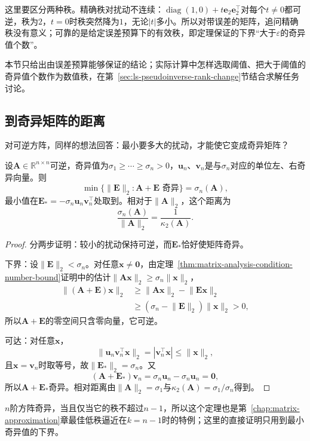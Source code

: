 这里要区分两种秩。精确秩对扰动不连续：$\operatorname{diag}(1,0)+t\bm e_2\bm e_2^\top$对每个$t\neq0$都可逆，秩为$2$，$t=0$时秩突然降为$1$，无论$|t|$多小。所以对带误差的矩阵，追问精确秩没有意义；可靠的是给定误差预算下的有效秩，即定理保证的下界“大于$\varepsilon$的奇异值个数”。

本节只给出由误差预算能够保证的结论；实际计算中怎样选取阈值、把大于阈值的奇异值个数作为数值秩，在第~\ref{sec:ls-pseudoinverse-rank-change}节结合求解任务讨论。

\subsection{到奇异矩阵的距离}
对可逆方阵，同样的想法回答：最小要多大的扰动，才能使它变成奇异矩阵？
\begin{theorem}[到奇异矩阵的距离]
\label{thm:ls-distance-to-singularity}
设$\bm A\in\mathbb R^{n\times n}$可逆，奇异值为$\sigma_1\geq\cdots\geq\sigma_n>0$，$\bm u_n$、$\bm v_n$是与$\sigma_n$对应的单位左、右奇异向量。则
\begin{equation}
 \min\{\lVert\bm E\rVert_2:\bm A+\bm E\text{ 奇异}\}=\sigma_n(\bm A),
 \label{eq:ls-distance-to-singularity}
\end{equation}
最小值在$\bm E_*=-\sigma_n\bm u_n\bm v_n^\top$处取到。相对于$\lVert\bm A\rVert_2$，这个距离为
\[
 \frac{\sigma_n(\bm A)}{\lVert\bm A\rVert_2}=\frac1{\kappa_2(\bm A)} .
\]
\end{theorem}
\begin{proof}
分两步证明：较小的扰动保持可逆，而$\bm E_*$恰好使矩阵奇异。

下界：设$\lVert\bm E\rVert_2<\sigma_n$。对任意$\bm x\neq\bm0$，由定理~\ref{thm:matrix-analysis-condition-number-bound}证明中的估计$\lVert\bm A\bm x\rVert_2\geq\sigma_n\lVert\bm x\rVert_2$，
\[
 \begin{aligned}
 \lVert(\bm A+\bm E)\bm x\rVert_2
 &\geq\lVert\bm A\bm x\rVert_2-\lVert\bm E\bm x\rVert_2\\
 &\geq(\sigma_n-\lVert\bm E\rVert_2)\lVert\bm x\rVert_2>0 ,
 \end{aligned}
\]
所以$\bm A+\bm E$的零空间只含零向量，它可逆。

可达：对任意$\bm x$，
\[
 \lVert\bm u_n\bm v_n^\top\bm x\rVert_2=|\bm v_n^\top\bm x|\leq\lVert\bm x\rVert_2 ,
\]
且$\bm x=\bm v_n$时取等号，故$\lVert\bm E_*\rVert_2=\sigma_n$。又
\[
 (\bm A+\bm E_*)\bm v_n=\sigma_n\bm u_n-\sigma_n\bm u_n=\bm0 ,
\]
所以$\bm A+\bm E_*$奇异。相对距离由$\lVert\bm A\rVert_2=\sigma_1$与$\kappa_2(\bm A)=\sigma_1/\sigma_n$得到。
\end{proof}
$n$阶方阵奇异，当且仅当它的秩不超过$n-1$，所以这个定理也是第~\ref{chap:matrix-approximation}章最佳低秩逼近在$k=n-1$时的特例；这里的直接证明只用到最小奇异值的下界。

